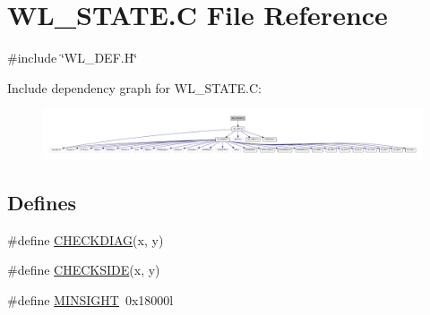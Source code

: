 \hypertarget{WL__STATE_8C}{
\section{WL\_\-STATE.C File Reference}
\label{WL__STATE_8C}
}
{\ttfamily \#include \char`\"{}WL\_\-DEF.H\char`\"{}}\par
Include dependency graph for WL\_\-STATE.C:
\nopagebreak
\begin{figure}[H]
\begin{center}
\leavevmode
\includegraphics[width=400pt]{WL__STATE_8C__incl}
\end{center}
\end{figure}
\subsection*{Defines}
\begin{DoxyCompactItemize}
\item 
\#define \hyperlink{WL__STATE_8C_ae9d98dc089ac680e627983201f31bb7f}{CHECKDIAG}(x, y)
\item 
\#define \hyperlink{WL__STATE_8C_afd15e6f6383a5e37013e5a267f3a74fc}{CHECKSIDE}(x, y)
\item 
\#define \hyperlink{WL__STATE_8C_ac84fc3a644e9e6dac37e6563be9664ef}{MINSIGHT}~0x18000l
\end{DoxyCompactItemize}
